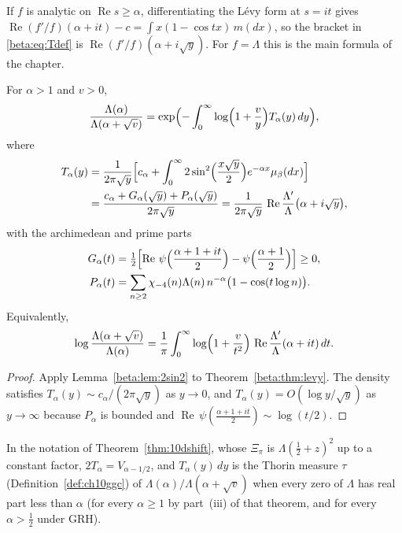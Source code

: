 If $f$ is analytic on $\operatorname{Re} s\ge\alpha$, differentiating the L\'evy form at $s=it$ gives $\operatorname{Re}(f'/f)(\alpha+it)-c=\int x(1-\cos tx)\,m(dx)$, so the bracket in \eqref{beta:eq:Tdef} is $\operatorname{Re}(f'/f)(\alpha+i\sqrt y)$. For $f=\Lambda$ this is the main formula of the chapter.

\begin{theorem}\label{beta:thm:thorin}
For $\alpha>1$ and $v>0$,
\begin{equation}\label{beta:eq:thorinbeta}
\frac{\Lambda(\alpha)}{\Lambda(\alpha+\sqrt v)}=\exp\Bigl(-\int_0^\infty\log\Bigl(1+\frac vy\Bigr)T_\alpha(y)\,dy\Bigr),
\end{equation}
where
\begin{align}
T_\alpha(y)&=\frac{1}{2\pi\sqrt y}\Bigl[c_\alpha+\int_0^\infty2\sin^2\Bigl(\frac{x\sqrt y}{2}\Bigr)e^{-\alpha x}\mu_\beta(dx)\Bigr]\label{beta:eq:Tsin}\\
&=\frac{c_\alpha+G_\alpha(\sqrt y)+P_\alpha(\sqrt y)}{2\pi\sqrt y}
=\frac{1}{2\pi\sqrt y}\,\operatorname{Re}\frac{\Lambda'}{\Lambda}\bigl(\alpha+i\sqrt y\bigr),\label{beta:eq:Tclosed}
\end{align}
with the archimedean and prime parts
\begin{align*}
G_\alpha(t)&=\tfrac12\Bigl[\operatorname{Re}\,\psi\Bigl(\frac{\alpha+1+it}{2}\Bigr)-\psi\Bigl(\frac{\alpha+1}{2}\Bigr)\Bigr]\ge0,\\
P_\alpha(t)&=\sum_{n\ge2}\chi_{-4}(n)\Lambda(n)\,n^{-\alpha}\bigl(1-\cos(t\log n)\bigr).
\end{align*}
Equivalently,
\begin{equation}\label{beta:eq:logformula}
\log\frac{\Lambda(\alpha+\sqrt v)}{\Lambda(\alpha)}=\frac1\pi\int_0^\infty\log\Bigl(1+\frac{v}{t^2}\Bigr)\,\operatorname{Re}\frac{\Lambda'}{\Lambda}(\alpha+it)\,dt .
\end{equation}
\end{theorem}

\begin{proof}
Apply Lemma~\ref{beta:lem:2sin2} to Theorem~\ref{beta:thm:levy}. The density satisfies $T_\alpha(y)\sim c_\alpha/(2\pi\sqrt y)$ as $y\to0$, and $T_\alpha(y)=O(\log y/\sqrt y)$ as $y\to\infty$ because $P_\alpha$ is bounded and $\operatorname{Re}\,\psi(\tfrac{\alpha+1+it}{2})\sim\log(t/2)$.
\end{proof}

In the notation of Theorem~\ref{thm:10dshift}, whose $\Xi_\pi$ is $\Lambda(\tfrac12+z)^2$ up to a constant factor, $2T_\alpha=V_{\alpha-1/2}$, and $T_\alpha(y)\,dy$ is the Thorin measure $\tau$ (Definition~\ref{def:ch10ggc}) of $\Lambda(\alpha)/\Lambda(\alpha+\sqrt v)$ when every zero of $\Lambda$ has real part less than $\alpha$ (for every $\alpha\ge1$ by part~(iii) of that theorem, and for every $\alpha>\frac12$ under GRH).

